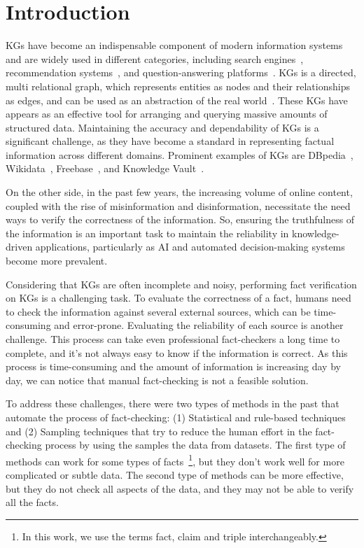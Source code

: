 \chapter{Introduction}\label{ch:intro}
\acp{KG} have become an indispensable component of modern information systems and are widely used in different categories, including search engines~\cite{google_knowledge_graph}, recommendation systems~\cite{guo2020surveyknowledgegraphbasedrecommender}, and question-answering platforms~\cite{omar2023universalquestionansweringplatformknowledge}.
\acp{KG} is a directed, multi relational graph, which represents entities as nodes and their relationships as edges, and can be used as an abstraction of the real world~\cite{ali2020keenuniverseecosystemknowledge}.
These \acp{KG} have appears as an effective tool for arranging and querying massive amounts of structured data.
Maintaining the accuracy and dependability of \acp{KG} is a significant challenge, as they have become a standard in representing factual information across diﬀerent domains.
Prominent examples of KGs are DBpedia~\cite{lehmann2015dbpedia}, Wikidata~\cite{10.1145/2629489}, Freebase~\cite{10.1145/1376616.1376746}, and Knowledge Vault~\cite{10.1145/2623330.2623623}.

On the other side, in the past few years, the increasing volume of online content, coupled with the rise of misinformation and disinformation, necessitate the need ways to verify the correctness of the information.
So, ensuring the truthfulness of the information is an important task to maintain the reliability in knowledge-driven applications, particularly as \ac{AI} and automated decision-making systems become more prevalent.

Considering that KGs are often incomplete and noisy, performing fact verification on \acp{KG} is a challenging task.
To evaluate the correctness of a fact, humans need to check the information against several external sources, which can be time-consuming and error-prone.
Evaluating the reliability of each source is another challenge.
This process can take even professional fact-checkers a long time to complete, and it's not always easy to know if the information is correct.
As this process is time-consuming and the amount of information is increasing day by day, we can notice that manual fact-checking is not a feasible solution.

To address these challenges, there were two types of methods in the past that automate the process of fact-checking:
(1) Statistical and rule-based techniques and (2) Sampling techniques that try to reduce the human effort in the fact-checking process by using the samples the data from datasets.
The first type of methods can work for some types of facts~\footnote{In this work, we use the terms fact, claim and triple interchangeably.}, but they don't work well for more complicated or subtle data.
The second type of methods can be more effective, but they do not check all aspects of the data, and they may not be able to verify all the facts.

